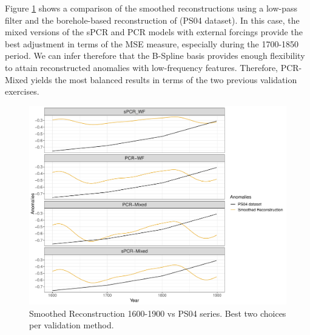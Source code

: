 \documentclass[12pt]{amsart}
\theoremstyle{plain}
\theoremstyle{definition}
\theoremstyle{remark}
\begin{document}
Figure \ref{fig:paleo15001} shows a comparison of the smoothed reconstructions
using a low-pass filter and the borehole-based reconstruction of
\cite{Pollack2004} (PS04 dataset). In this case, the mixed versions of the sPCR
and PCR models with external forcings provide the best adjustment in terms of
the MSE measure, especially during the 1700-1850 period. We can infer therefore
that the B-Spline basis provides enough flexibility to attain reconstructed
anomalies with low-frequency features. Therefore, PCR-Mixed yields the most balanced
results in terms of the two previous validation exercises.

\begin{figure}
  \centering
  \includegraphics[scale=0.40]{Rec1500_Final}
  \caption{Smoothed Reconstruction 1600-1900 vs PS04 series. Best two choices per validation method.}
  \label{fig:paleo15001}
\end{figure}
\end{document}
